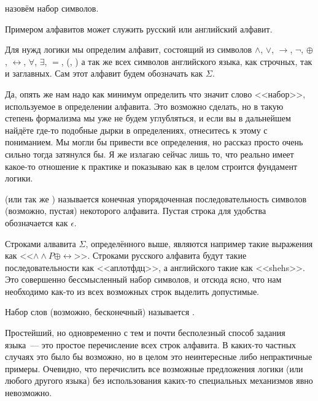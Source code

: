 \begin{definition}
 назовём набор символов.
\end{definition}

\begin{example}
Примером алфавитов может служить русский или английский алфавит.
\end{example}

\begin{example}
Для нужд логики мы определим алфавит, состоящий из символов $\land$, $\lor$, $\to$, $\neg$, $\oplus$, $\leftrightarrow$, $\forall$, $\exists$, $=$, (, ) а так же всех символов английского языка, как строчных, так и заглавных. Сам этот алфавит будем обозначать как $\Sigma$.
\end{example}

Да, опять же нам надо как минимум определить что значит слово <<набор>>, используемое в определении алфавита. Это возможно сделать, но в такую степень формализма мы уже не будем углубляться, и если вы в дальнейшем найдёте где-то подобные дырки в определениях, отнеситесь к этому с пониманием. Мы могли бы привести все определения, но рассказ просто очень сильно тогда затянулся бы. Я же излагаю сейчас лишь то, что реально имеет какое-то отношение к практике и показываю как в целом строится фундамент логики.

\begin{definition}
 (или так же ) называется конечная упорядоченная последовательность символов (возможно, пустая) некоторого алфавита. Пустая строка для удобства обозначается как $\epsilon$.
\end{definition}

Строками алвавита $\Sigma$, определённого выше, являются например такие выражения как <<$\land\land P\oplus\leftrightarrow$>>. Строками русского алфавита будут такие последовательности как <<аплотфдц>>, а английского такие как <<shehs>>. Это совершенно бессмысленный набор символов, и отсюда ясно, что нам необходимо как-то из всех возможных строк выделить допустимые.

\begin{definition}
Набор слов (возможно, бесконечный) называется .
\end{definition}

Простейший, но одновременно с тем и почти бесполезный способ задания языка~--- это простое перечисление всех строк алфавита. В каких-то частных случаях это было бы возможно, но в целом это неинтересные либо непрактичные примеры. Очевидно, что перечислить все возможные предложения логики (или любого другого языка) без использования каких-то специальных механизмов явно невозможно.

